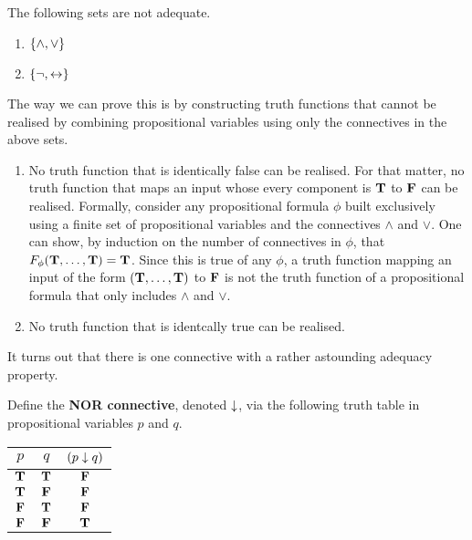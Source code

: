 \begin{boxnexample}
    The following sets are not adequate.
    \begin{enumerate}[label = (\roman*)]
        \item $\left\{ \land, \lor \right\}$
        \item $\left\{ \neg, \leftrightarrow \right\}$
    \end{enumerate}
    The way we can prove this is by constructing truth functions that cannot be realised by combining propositional variables using only the connectives in the above sets.
    \begin{enumerate}[label = (\roman*)]
        \item No truth function that is identically false can be realised. For that matter, no truth function that maps an input whose every component is $\mathbf{T}$ to $\mathbf{F}$ can be realised. Formally, consider any propositional formula $\phi$ built exclusively using a finite set of propositional variables and the connectives $\land$ and $\lor$. One can show, by induction on the number of connectives in $\phi$, that $F_{\phi}(\mathbf{T}, \ldots, \mathbf{T}) = \mathbf{T}$. Since this is true of any $\phi$, a truth function mapping an input of the form $(\mathbf{T}, \ldots, \mathbf{T})$ to $\mathbf{F}$ is not the truth function of a propositional formula that only includes $\land$ and $\lor$.
        
        \item No truth function that is identcally true can be realised.
    \end{enumerate}
\end{boxnexample}

It turns out that there is one connective with a rather astounding adequacy property.

\begin{boxdefinition}
    Define the \textbf{NOR connective}, denoted $\downarrow$, via the following truth table in propositional variables $p$ and $q$.
    \begin{table}[H]
        \centering
        \begin{tabular}{cc|c}
            $p$ & $q$ & $\left( p \downarrow q \right)$ \\ 
            \hline
            $\mathbf{T}$ & $\mathbf{T}$ & $\mathbf{F}$ \\
            $\mathbf{T}$ & $\mathbf{F}$ & $\mathbf{F}$ \\
            $\mathbf{F}$ & $\mathbf{T}$ & $\mathbf{F}$ \\
            $\mathbf{F}$ & $\mathbf{F}$ & $\mathbf{T}$
        \end{tabular}
    \end{table}
\end{boxdefinition}

